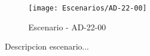 \begin{figure}[H]
\centering
\texttt{[image: Escenarios/AD-22-00]}
\caption{Escenario - AD-22-00}
\label{fig:AD-22-00}
\end{figure}

Descripcion escenario...
\clearpage
